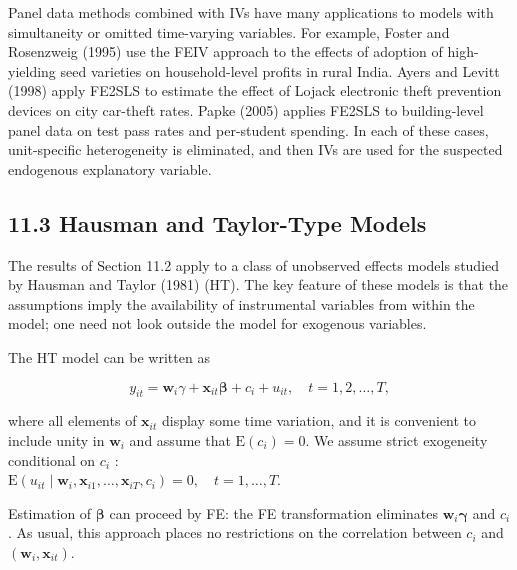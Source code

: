 \documentclass[10pt]{article}
\begin{document}
Panel data methods combined with IVs have many applications to models with simultaneity or omitted time-varying variables. For example, Foster and Rosenzweig (1995) use the FEIV approach to the effects of adoption of high-yielding seed varieties on household-level profits in rural India. Ayers and Levitt (1998) apply FE2SLS to estimate the effect of Lojack electronic theft prevention devices on city car-theft rates. Papke (2005) applies FE2SLS to building-level panel data on test pass rates and per-student spending. In each of these cases, unit-specific heterogeneity is eliminated, and then IVs are used for the suspected endogenous explanatory variable.

\subsection*{11.3 Hausman and Taylor-Type Models}
The results of Section 11.2 apply to a class of unobserved effects models studied by Hausman and Taylor (1981) (HT). The key feature of these models is that the assumptions imply the availability of instrumental variables from within the model; one need not look outside the model for exogenous variables.

The HT model can be written as


\begin{equation*}
y_{i t}=\mathbf{w}_{i} \gamma+\mathbf{x}_{i t} \boldsymbol{\beta}+c_{i}+u_{i t}, \quad t=1,2, \ldots, T, \tag{11.29}
\end{equation*}


where all elements of $\mathbf{x}_{i t}$ display some time variation, and it is convenient to include unity in $\mathbf{w}_{i}$ and assume that $\mathrm{E}\left(c_{i}\right)=0$. We assume strict exogeneity conditional on $c_{i}$ :\\
$\mathrm{E}\left(u_{i t} \mid \mathbf{w}_{i}, \mathbf{x}_{i 1}, \ldots, \mathbf{x}_{i T}, c_{i}\right)=0, \quad t=1, \ldots, T$.

Estimation of $\boldsymbol{\beta}$ can proceed by FE: the FE transformation eliminates $\mathbf{w}_{i} \boldsymbol{\gamma}$ and $c_{i}$. As usual, this approach places no restrictions on the correlation between $c_{i}$ and $\left(\mathbf{w}_{i}, \mathbf{x}_{i t}\right)$.
\end{document}
